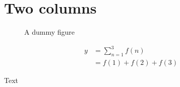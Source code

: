 \documentclass{article}%
\begin{document}
\twocolumn
\section*{Two columns}
\blindtext[3]
\begin{figure}
  \centering
  \caption{A dummy figure}
\end{figure}
\begin{align}
  y &= \sum_{n=1}^3 f(n) \\
    &= f(1) + f(2) + f(3)
\end{align}
\par{}\noindent
Text
\end{document}
